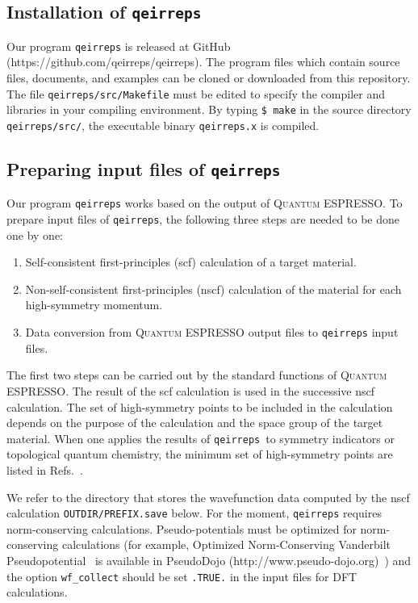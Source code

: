 \documentclass[3p,preprint]{elsarticle}
\newcommand{\qeirreps}{\texttt{qeirreps}}
\newcommand{\akishi}[1]{ { \color{magenta} \footnotesize (\textsf{AM}) \textsf{\textsl{#1}} } }
\begin{document}
\subsection{Installation of \texttt{qeirreps}}
Our program \texttt{qeirreps} is released at GitHub (https://github.com/qeirreps/qeirreps). The program files which contain source files, documents, and examples can be cloned or downloaded from this repository. The file \texttt{qeirreps/src/Makefile} must be edited to specify the compiler and libraries in your compiling environment. By typing \texttt{\$ make} in the source directory \texttt{qeirreps/src/}, the executable binary \texttt{qeirreps.x} is compiled. 

\subsection{Preparing input files of \texttt{qeirreps}}\label{sub-sec:prep}
Our program \texttt{qeirreps} works based on the output of \textsc{Quantum ESPRESSO}.
To prepare input files of \texttt{qeirreps}, the following three steps are needed to be done one by one:
\begin{enumerate}
	\item Self-consistent first-principles (scf) calculation of a target material.
	\item Non-self-consistent first-principles (nscf) calculation of the material for each high-symmetry momentum.
	\item Data conversion from \textsc{Quantum ESPRESSO} output files to \texttt{qeirreps} input files.
\end{enumerate}
The first two steps can be carried out by the standard functions of \textsc{Quantum ESPRESSO}.
The result of the scf calculation is used in the successive nscf calculation. 
The set of high-symmetry points to be included in the calculation depends on the purpose of the calculation and the space group of the target material.  When one applies the results of \qeirreps\ to symmetry indicators or topological quantum chemistry, the minimum set of high-symmetry points are listed in Refs.~\cite{QuantitativeMappings, Vergniory2019,Tang2019}.

We refer to the directory that stores the wavefunction data computed by the nscf calculation \texttt{OUTDIR/PREFIX.save} below.
For the moment, \texttt{qeirreps} requires norm-conserving calculations.
Pseudo-potentials must be optimized for norm-conserving calculations (for example, Optimized Norm-Conserving Vanderbilt Pseudopotential~\cite{oncvpsp} is available in PseudoDojo (http://www.pseudo-dojo.org)~\cite{pseudodojo}) and the option \texttt{wf\_collect} should be set \texttt{.TRUE.} in the input files for DFT calculations. 
\end{document}
